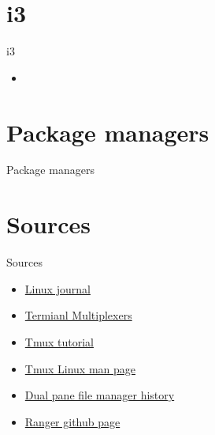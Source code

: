 \documentclass[usenames,dvipsnames,10pt,aspectratio=169]{beamer}
\begin{document}

\section{i3}
\begin{frame}{i3}
    \begin{itemize}
        \item 
    \end{itemize}
\end{frame}

\section{Package managers}
\begin{frame}{Package managers}
    
\end{frame}



\section{Sources}
\begin{frame}{Sources}
    \begin{itemize}
        \item \href{https://www.linuxjournal.com/node/1203742}{Linux journal}
        \item \href{https://opensource.com/article/21/5/linux-terminal-multiplexer}{Termianl Multiplexers}
        \item \href{https://protechnotes.com/comprehensive-tmux-tutorial-for-beginners-with-a-cheat-sheet/}{Tmux tutorial}
        \item \href{https://man7.org/linux/man-pages/man1/tmux.1.html}{Tmux Linux man page}
        \item \href{https://fman.io/blog/dual-pane-file-manager-history/}{Dual pane file manager history}
        \item \href{https://github.com/ranger/ranger}{Ranger github page}
    \end{itemize}
\end{frame}
\end{document}
